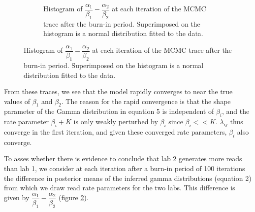 \documentclass{article}
\begin{document}
\begin{figure}[h]
\begin{subfigure}[t]{0.47\linewidth}
		\caption{Histogram of $\dfrac{\alpha_1}{\beta_1} - \dfrac{\alpha_2}{\beta_2}$ at each iteration of the MCMC trace after the burn-in period.  Superimposed on the histogram is a normal distribution fitted to the data.}
		\label{fig:means}
	\end{subfigure}
\end{figure}


From these traces, we see that the model rapidly converges to near the true values of $\beta_1$ and $\beta_2$. The reason for the rapid convergence is that the shape parameter of the Gamma distribution in equation 5 is independent of $\beta_i$, and the rate parameter $\beta_i+K$ is only weakly perturbed by $\beta_i$ since $\beta_i << K$. $\lambda_{ij}$ thus converge in the first iteration, and given these converged rate parameters,  $\beta_i$ also converge.

To asses whether there is evidence to conclude that lab 2 generates more reads than lab 1, we consider at each iteration after a burn-in period of 100 iterations the difference in posterior means of the inferred gamma distributions (equation 2) from which we draw read rate parameters for the two labs. This difference is given by $\dfrac{\alpha_1}{\beta_1} - \dfrac{\alpha_2}{\beta_2}$ (figure \ref{fig:means}).
\end{document}
